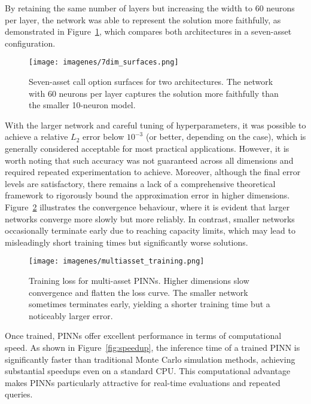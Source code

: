 \documentclass[12pt]{report} %
\theoremstyle{plain}           %
\theoremstyle{definition}      %
\theoremstyle{remark}          %
\begin{document}
By retaining the same number of layers but increasing the width to 60 neurons per 
layer, the network was able to represent the solution more faithfully, as demonstrated in 
Figure~\ref{fig:7dim_surfaces}, which compares both architectures in a seven-asset configuration.

\begin{figure}[H]
    \centering
    \texttt{[image: imagenes/7dim\_surfaces.png]}
    \caption{Seven-asset call option surfaces for two architectures. The network with 60 neurons 
	per layer captures the solution more faithfully than the smaller 10-neuron model.}
    \label{fig:7dim_surfaces}
\end{figure}

With the larger network and careful tuning of hyperparameters, it was possible to achieve a 
relative \(L_2\) error below \(10^{-3}\) (or better, depending on the case), which is generally considered 
acceptable for most practical applications. However, it is worth noting that such accuracy was not guaranteed 
across all dimensions and required repeated experimentation to achieve. Moreover, although 
the final error levels are satisfactory, there remains a lack of a comprehensive theoretical 
framework to rigorously bound the approximation error in higher dimensions. 
Figure~\ref{fig:multiasset_training} illustrates the convergence behaviour, where it is evident 
that larger networks converge more slowly but more reliably. In contrast, smaller networks 
occasionally terminate early due to reaching capacity limits, which may lead to misleadingly 
short training times but significantly worse solutions.

\begin{figure}[H]
    \centering
    \texttt{[image: imagenes/multiasset\_training.png]}
    \caption{Training loss for multi-asset PINNs. Higher dimensions slow convergence and 
	flatten the loss curve. The smaller network sometimes terminates early, yielding a shorter 
	training time but a noticeably larger error.}
    \label{fig:multiasset_training}
\end{figure}

Once trained, PINNs offer excellent performance in terms of computational speed. 
As shown in Figure~\ref{fig:speedup}, the inference time of a trained PINN is significantly 
faster than traditional Monte Carlo simulation methods, achieving substantial speedups even 
on a standard CPU. This computational advantage makes PINNs particularly attractive for real-time 
evaluations and repeated queries.
\end{document}
